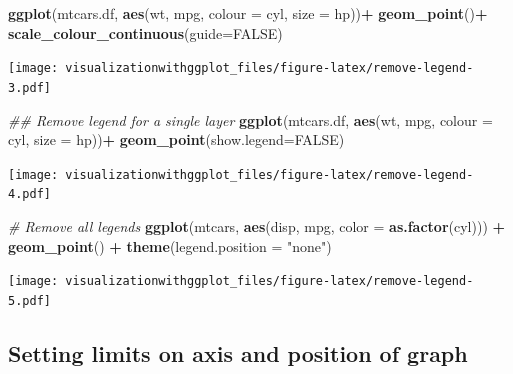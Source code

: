 \documentclass[]{krantz}
\makeatletter
\newenvironment{Shaded}{\begin{snugshade}}{\end{snugshade}}
\newcommand{\CommentTok}[1]{\textcolor[rgb]{0.56,0.35,0.01}{\textit{#1}}}
\newcommand{\DataTypeTok}[1]{\textcolor[rgb]{0.13,0.29,0.53}{#1}}
\newcommand{\KeywordTok}[1]{\textcolor[rgb]{0.13,0.29,0.53}{\textbf{#1}}}
\newcommand{\NormalTok}[1]{#1}
\newcommand{\OperatorTok}[1]{\textcolor[rgb]{0.81,0.36,0.00}{\textbf{#1}}}
\newcommand{\OtherTok}[1]{\textcolor[rgb]{0.56,0.35,0.01}{#1}}
\newcommand{\StringTok}[1]{\textcolor[rgb]{0.31,0.60,0.02}{#1}}
\newenvironment{kframe}{%
\medskip{}
\setlength{\fboxsep}{.8em}
 \def\at@end@of@kframe{}%
 \ifinner\ifhmode%
  \def\at@end@of@kframe{\end{minipage}}%
  \begin{minipage}{\columnwidth}%
 \fi\fi%
 \def\FrameCommand##1{\hskip\@totalleftmargin \hskip-\fboxsep
 \colorbox{shadecolor}{##1}\hskip-\fboxsep
     \hskip-\linewidth \hskip-\@totalleftmargin \hskip\columnwidth}%
 \MakeFramed {\advance\hsize-\width
   \@totalleftmargin\z@ \linewidth\hsize
   \@setminipage}}%
 {\par\unskip\endMakeFramed%
 \at@end@of@kframe}
\renewenvironment{Shaded}{\begin{kframe}}{\end{kframe}}
\makeatother
\begin{document}
\begin{Shaded}
\begin{Highlighting}[]
\KeywordTok{ggplot}\NormalTok{(mtcars.df, }\KeywordTok{aes}\NormalTok{(wt, mpg, }\DataTypeTok{colour =}\NormalTok{ cyl, }\DataTypeTok{size =}\NormalTok{ hp))}\OperatorTok{+}
\StringTok{  }\KeywordTok{geom_point}\NormalTok{()}\OperatorTok{+}
\StringTok{  }\KeywordTok{scale_colour_continuous}\NormalTok{(}\DataTypeTok{guide=}\OtherTok{FALSE}\NormalTok{) }
\end{Highlighting}
\end{Shaded}

\texttt{[image: visualizationwithggplot\_files/figure-latex/remove-legend-3.pdf]}

\begin{Shaded}
\begin{Highlighting}[]
\CommentTok{## Remove legend for a single layer}
\KeywordTok{ggplot}\NormalTok{(mtcars.df, }\KeywordTok{aes}\NormalTok{(wt, mpg, }\DataTypeTok{colour =}\NormalTok{ cyl, }\DataTypeTok{size =}\NormalTok{ hp))}\OperatorTok{+}
\StringTok{  }\KeywordTok{geom_point}\NormalTok{(}\DataTypeTok{show.legend=}\OtherTok{FALSE}\NormalTok{)}
\end{Highlighting}
\end{Shaded}

\texttt{[image: visualizationwithggplot\_files/figure-latex/remove-legend-4.pdf]}

\begin{Shaded}
\begin{Highlighting}[]
\CommentTok{# Remove all legends}
\KeywordTok{ggplot}\NormalTok{(mtcars, }\KeywordTok{aes}\NormalTok{(disp,  mpg, }\DataTypeTok{color =} \KeywordTok{as.factor}\NormalTok{(cyl))) }\OperatorTok{+}\StringTok{ }\KeywordTok{geom_point}\NormalTok{() }\OperatorTok{+}
\StringTok{  }\KeywordTok{theme}\NormalTok{(}\DataTypeTok{legend.position =} \StringTok{"none"}\NormalTok{)}
\end{Highlighting}
\end{Shaded}

\texttt{[image: visualizationwithggplot\_files/figure-latex/remove-legend-5.pdf]}

\hypertarget{setting-limits-on-axis-and-position-of-graph}{%
\subsection{Setting limits on axis and position of graph}\label{setting-limits-on-axis-and-position-of-graph}}
\end{document}
